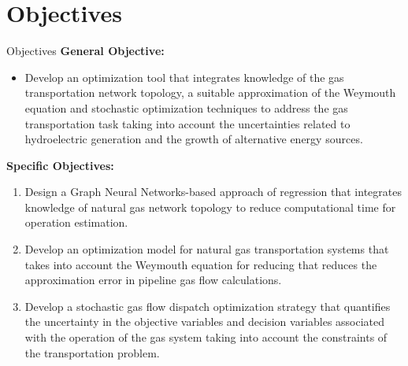 \documentclass[hyperref={colorlinks,citecolor=blue,linkcolor=blue,urlcolor=blue}]{beamer}
\begin{document}
\section{Objectives}
\begin{frame}{Objectives}
\footnotesize
\textbf{General Objective:}
\begin{itemize}
    \item Develop an optimization tool that integrates knowledge of the gas transportation network topology, a suitable approximation of the Weymouth equation and stochastic optimization techniques to address the gas transportation task taking into account the uncertainties related to hydroelectric generation and the growth of alternative energy sources.
\end{itemize}

    \textbf{Specific Objectives:}
\begin{enumerate}
    \footnotesize
    \item Design a Graph Neural Networks-based approach of regression that integrates knowledge of natural gas network topology to reduce computational time for operation estimation.    
    \item Develop an optimization model for natural gas transportation systems that takes into account the Weymouth equation for reducing that reduces the approximation error in pipeline gas flow calculations.
    \item Develop a stochastic gas flow dispatch optimization strategy that quantifies the uncertainty in the objective variables and decision variables associated with the operation of the gas system taking into account the constraints of the transportation problem.
\end{enumerate}
\end{frame}
\end{document}
